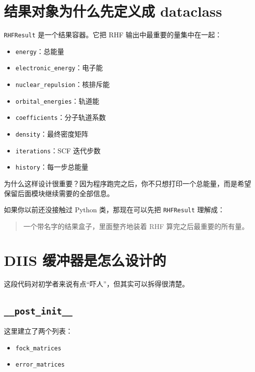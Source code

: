 \documentclass[UTF8,11pt,fontset=fandol]{ctexbook}
\begin{document}
\section{结果对象为什么先定义成 dataclass}



\texttt{RHFResult} 是一个结果容器。它把 RHF 输出中最重要的量集中在一起：
\begin{itemize}
  \item \texttt{energy}：总能量
  \item \texttt{electronic\_energy}：电子能
  \item \texttt{nuclear\_repulsion}：核排斥能
  \item \texttt{orbital\_energies}：轨道能
  \item \texttt{coefficients}：分子轨道系数
  \item \texttt{density}：最终密度矩阵
  \item \texttt{iterations}：SCF 迭代步数
  \item \texttt{history}：每一步总能量
\end{itemize}

为什么这样设计很重要？因为程序跑完之后，你不只想打印一个总能量，而是希望保留后面模块继续需要的全部信息。

如果你以前还没接触过 Python 类，那现在可以先把 \texttt{RHFResult} 理解成：

\begin{quote}
一个带名字的结果盒子，里面整齐地装着 RHF 算完之后最重要的所有量。
\end{quote}

\section{DIIS 缓冲器是怎么设计的}



这段代码对初学者来说有点“吓人”，但其实可以拆得很清楚。

\subsection*{\texttt{\_\_post\_init\_\_}}

这里建立了两个列表：
\begin{itemize}
  \item \texttt{fock\_matrices}
  \item \texttt{error\_matrices}
\end{itemize}
\end{document}
